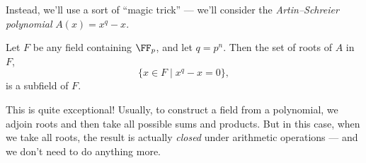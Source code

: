 Instead, we'll use a sort of ``magic trick'' --- we'll consider the \emph{Artin--Schreier polynomial} $A(x) = x^q - x$. 




\begin{lemma}\label{artin schreier}
Let $F$ be any field containing $\FF_p$, and let $q = p^n$. Then the set of roots of $A$ in $F$, \[\{x \in F \mid x^q - x = 0\},\] is a subfield of $F$.
\end{lemma}

This is quite exceptional! Usually, to construct a field from a polynomial, we adjoin roots and then take all possible sums and products. But in this case, when we take all roots, the result is actually \emph{closed} under arithmetic operations --- and we don't need to do anything more.
 
